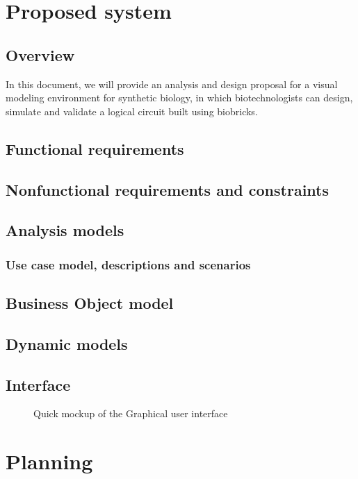 \documentclass[a4paper]{article}
\begin{document}
\section{Proposed system}
\subsection{Overview} 		%
In this document, we will provide an analysis and design proposal for a visual modeling environment for synthetic biology, in which biotechnologists can design, simulate and validate a logical circuit built using biobricks.

\subsection{Functional requirements} %
\subsection{Nonfunctional requirements and constraints} %
\subsection{Analysis models}
\subsubsection{Use case model, descriptions and scenarios}
\subsection{Business Object model} %
\subsection{Dynamic models}
\subsection{Interface} %
\begin{figure}[h!]
\caption{Quick mockup of the Graphical user interface}
\end{figure}

\section{Planning}  %
\end{document}
